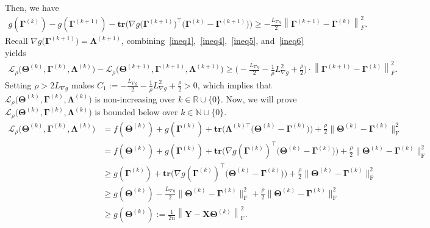 \documentclass[alpha-refs]{wiley-article}
\begin{document}
Then, we have
\begin{align} \label{ineq6}
    g(\boldsymbol{\Gamma}^{(k)}) - g(\boldsymbol{\Gamma}^{(k+1)})
    - \textbf{tr}\bigg(\nabla g\big(\boldsymbol{\Gamma}^{(k+1)}\big)^\top
    \big(\boldsymbol{\Gamma}^{(k)}-\boldsymbol{\Gamma}^{(k+1)}\big)\bigg) \geq -\frac{L_{\nabla g}}{2}
    \left\| \boldsymbol{\Gamma}^{(k+1)} - \boldsymbol{\Gamma}^{(k)} \right\|_{F}^{2}.
\end{align}
Recall $\nabla g\big( \boldsymbol{\Gamma}^{(k+1)} \big) = \boldsymbol{\Lambda}^{(k+1)}$, combining~\eqref{ineq1},~\eqref{ineq4},~\eqref{ineq5}, and~\eqref{ineq6} yields
\begin{align*}
    \mathcal{L}_{\rho} \big( \boldsymbol{\Theta}^{(k)},\boldsymbol{\Gamma}^{(k)},\boldsymbol{\Lambda}^{(k)} \big)
    - \mathcal{L}_{\rho} \big( \boldsymbol{\Theta}^{(k+1)},\boldsymbol{\Gamma}^{(k+1)},\boldsymbol{\Lambda}^{(k+1)} \big)
    \geq \bigg(  -\frac{L_{\nabla g}}{2} -\frac{1}{\rho} L_{\nabla g}^{2} + \frac{\rho}{2} \bigg) \cdot
    \left\| \boldsymbol{\Gamma}^{(k+1)} - \boldsymbol{\Gamma}^{(k)} \right\|_{F}^{2}.
\end{align*}
Setting $\rho>2L_{\nabla g}$ makes $C_{1}:=-\frac{L_{\nabla g}}{2} -\frac{1}{\rho} L_{\nabla g}^{2} + \frac{\rho}{2}>0$, which implies that $\mathcal{L}_{\rho}\big( \boldsymbol{\Theta}^{(k)},\boldsymbol{\Gamma}^{(k)},\boldsymbol{\Lambda}^{(k)} \big)$ is non-increasing over $k\in\mathbb{R}\cup \{0\}$.
Now, we will prove $ \mathcal{L}_{\rho}\big(\boldsymbol{\Theta}^{(k)},\boldsymbol{\Gamma}^{(k)},\boldsymbol{\Lambda}^{(k)}\big)$ is bounded below over $k\in\mathbb{N}\cup\{0\}$.
\begin{align*}
    \mathcal{L}_{\rho}\big(\boldsymbol{\Theta}^{(k)},\boldsymbol{\Gamma}^{(k)},\boldsymbol{\Lambda}^{(k)}\big)
    &= f(\boldsymbol{\Theta}^{(k)}) + g(\boldsymbol{\Gamma}^{(k)}) + \textbf{tr}\big( \boldsymbol{\Lambda}^{(k)\top}\big( \boldsymbol{\Theta}^{(k)} - \boldsymbol{\Gamma}^{(k)} \big)\big)
    + \frac{\rho}{2} \| \boldsymbol{\Theta}^{(k)}-\boldsymbol{\Gamma}^{(k)} \|_{\text{F}}^{2} \\
    &= f(\boldsymbol{\Theta}^{(k)}) + g(\boldsymbol{\Gamma}^{(k)}) + \textbf{tr}\big( \nabla g(\boldsymbol{\Gamma}^{(k)})^\top\big( \boldsymbol{\Theta}^{(k)} - \boldsymbol{\Gamma}^{(k)} \big)\big)
    + \frac{\rho}{2} \| \boldsymbol{\Theta}^{(k)}-\boldsymbol{\Gamma}^{(k)} \|_{\text{F}}^{2} \\
    &\geq g(\boldsymbol{\Gamma}^{(k)}) + \textbf{tr}\big( \nabla g(\boldsymbol{\Gamma}^{(k)})^\top\big( \boldsymbol{\Theta}^{(k)} - \boldsymbol{\Gamma}^{(k)} \big)\big)
    + \frac{\rho}{2} \| \boldsymbol{\Theta}^{(k)}-\boldsymbol{\Gamma}^{(k)} \|_{\text{F}}^{2} \\
    &\geq g(\boldsymbol{\Theta}^{(k)}) -\frac{L_{\nabla g}}{2}\| \boldsymbol{\Theta}^{(k)}-\boldsymbol{\Gamma}^{(k)} \|_{\text{F}}^{2} + \frac{\rho}{2} \| \boldsymbol{\Theta}^{(k)}-\boldsymbol{\Gamma}^{(k)} \|_{\text{F}}^{2} \\
    &\geq g(\boldsymbol{\Theta}^{(k)})
    :=\frac{1}{2n}\left\|\boldsymbol{Y}-\boldsymbol{X\Theta}^{(k)}\right\|_{\text{F}}^{2}.
\end{align*}
\end{document}
